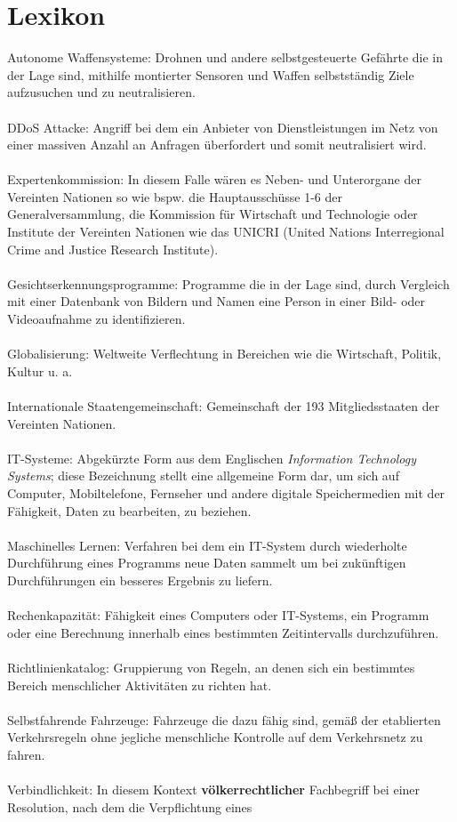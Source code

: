 \documentclass[a4paper,11pt]{article}
\begin{document}
\vspace{1cm}

   \section{Lexikon}

Autonome Waffensysteme: Drohnen und andere selbstgesteuerte Gefährte die in der Lage sind, mithilfe montierter Sensoren und Waffen selbstständig Ziele aufzusuchen und zu neutralisieren. \\ \\ DDoS Attacke: Angriff bei dem ein Anbieter von Dienstleistungen im Netz von einer massiven Anzahl an Anfragen überfordert und somit neutralisiert wird. \\ \\ Expertenkommission: In diesem Falle wären es Neben- und Unterorgane der Vereinten Nationen so wie bspw. die Hauptausschüsse 1-6 der Generalversammlung, die Kommission für Wirtschaft und Technologie oder Institute der Vereinten Nationen wie das UNICRI (United Nations Interregional Crime and Justice Research Institute). \\ \\ Gesichtserkennungsprogramme: Programme die in der Lage sind, durch Vergleich mit einer Datenbank von Bildern und Namen eine Person in einer Bild- oder Videoaufnahme zu identifizieren. \\ \\ Globalisierung: Weltweite Verflechtung in Bereichen wie die Wirtschaft, Politik, Kultur u. a. \\ \\ Internationale Staatengemeinschaft: Gemeinschaft der 193 Mitgliedsstaaten der Vereinten Nationen. \\ \\ IT-Systeme: Abgekürzte Form aus dem Englischen \textit{Information Technology Systems}; diese Bezeichnung stellt eine allgemeine Form dar, um sich auf Computer, Mobiltelefone, Fernseher und andere digitale Speichermedien mit der Fähigkeit, Daten zu bearbeiten, zu beziehen. \\ \\ Maschinelles Lernen: Verfahren bei dem ein IT-System durch wiederholte Durchführung eines Programms neue Daten sammelt um bei zukünftigen Durchführungen ein besseres Ergebnis zu liefern. \\ \\ Rechenkapazität: Fähigkeit eines Computers oder IT-Systems, ein Programm oder eine Berechnung innerhalb eines bestimmten Zeitintervalls durchzuführen. \\ \\ Richtlinienkatalog: Gruppierung von Regeln, an denen sich ein bestimmtes Bereich menschlicher Aktivitäten zu richten hat. \\ \\ Selbstfahrende Fahrzeuge: Fahrzeuge die dazu fähig sind, gemäß der etablierten Verkehrsregeln ohne jegliche menschliche Kontrolle auf dem Verkehrsnetz zu fahren. \\ \\ Verbindlichkeit: In diesem Kontext \textbf{völkerrechtlicher} Fachbegriff bei einer Resolution, nach dem die Verpflichtung eines 
\end{document}
